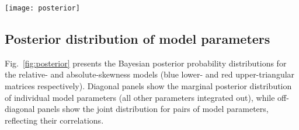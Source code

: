 \begin{figure*}
  \texttt{[image: posterior]}
  \caption{Posterior distributions of the model parameters, listed in Table~\ref{tab:parameters}, for the relative-skewness (blue lower diagonal) and absolute-skewness (red upper diagonal) models. The diagonal panels are the marginal likelihood distributions of individual model parameters, while off-diagonal panels are joint distributions for pairs of model parameters.}
  \label{fig:posterior}
\end{figure*}

\subsection{Posterior distribution of model parameters}
Fig.~\ref{fig:posterior} presents the Bayesian posterior probability distributions for the relative- and absolute-skewness models (blue lower- and red upper-triangular matrices respectively).
Diagonal panels show the marginal posterior distribution of individual model parameters (all other parameters integrated out), while off-diagonal panels show the joint distribution for pairs of model parameters, reflecting their correlations.

